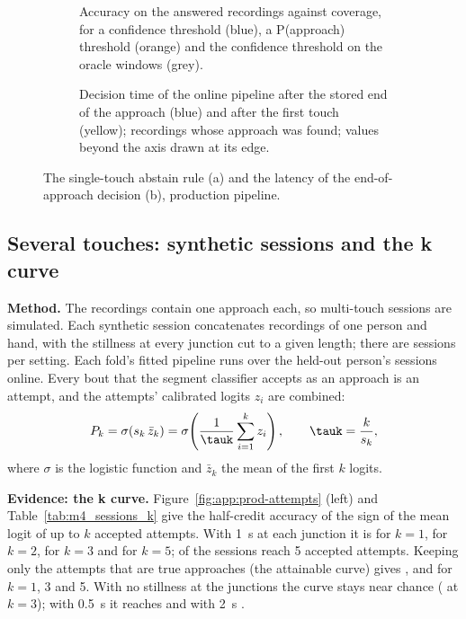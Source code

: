 \begin{figure}[htbp]
  \centering
  \begin{subfigure}[t]{0.49\linewidth}
    \centering
    \caption{Accuracy on the answered recordings against coverage, for a confidence threshold (blue), a P(approach) threshold (orange) and the confidence threshold on the oracle windows (grey).}
    \label{fig:M4_07_coverage}\label{fig:app:prod-coverage}
  \end{subfigure}\hfill
  \begin{subfigure}[t]{0.49\linewidth}
    \centering
    \caption{Decision time of the online pipeline after the stored end of the approach (blue) and after the first touch (yellow); recordings whose approach was found; values beyond the axis drawn at its edge.}
    \label{fig:M4_09_latency}\label{fig:app:prod-latency}
  \end{subfigure}
  \caption{The single-touch abstain rule (a) and the latency of the end-of-approach decision (b), production pipeline.}
  \label{fig:app:prod-coverage-latency}
\end{figure}
\FloatBarrier

\subsection{Several touches: synthetic sessions and the k curve}\label{app:prod:sessions}

\textbf{Method.}
The recordings contain one approach each, so multi-touch sessions are simulated.
Each synthetic session concatenates  recordings of one person and hand, with the stillness at every junction cut to a given length; there are  sessions per setting.
Each fold's fitted pipeline runs over the held-out person's sessions online.
Every bout that the segment classifier accepts as an approach is an attempt, and the attempts' calibrated logits $z_i$ are combined:
\begin{equation}
  P_k = \sigma\!\left(s_k\,\bar z_k\right) = \sigma\!\left(\frac{1}{\tauk}\sum_{i=1}^{k} z_i\right), \qquad \tauk = \frac{k}{s_k},
  \label{eq:prod-aggregate}
\end{equation}
where $\sigma$ is the logistic function and $\bar z_k$ the mean of the first $k$ logits.

\textbf{Evidence: the k curve.}
Figure~\ref{fig:app:prod-attempts} (left) and Table~\ref{tab:m4_sessions_k} give the half-credit accuracy of the sign of the mean logit of up to $k$ accepted attempts.
With 1~s at each junction it is  for $k = 1$,  for $k = 2$,  for $k = 3$ and  for $k = 5$;  of the sessions reach 5 accepted attempts.
Keeping only the attempts that are true approaches (the attainable curve) gives ,  and  for $k = 1$, 3 and 5.
With no stillness at the junctions the curve stays near chance ( at $k = 3$); with 0.5~s it reaches  and with 2~s .


